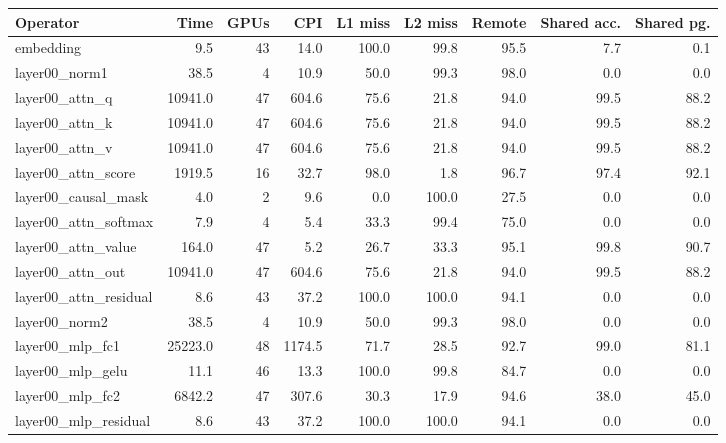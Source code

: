 \begin{tabular}{lrrrrrrrr}
\toprule
Operator & Time & GPUs & CPI & L1 miss & L2 miss & Remote & Shared acc. & Shared pg. \\
\midrule
embedding & 9.5 & 43 & 14.0 & 100.0 & 99.8 & 95.5 & 7.7 & 0.1 \\
layer00\_norm1 & 38.5 & 4 & 10.9 & 50.0 & 99.3 & 98.0 & 0.0 & 0.0 \\
layer00\_attn\_q & 10941.0 & 47 & 604.6 & 75.6 & 21.8 & 94.0 & 99.5 & 88.2 \\
layer00\_attn\_k & 10941.0 & 47 & 604.6 & 75.6 & 21.8 & 94.0 & 99.5 & 88.2 \\
layer00\_attn\_v & 10941.0 & 47 & 604.6 & 75.6 & 21.8 & 94.0 & 99.5 & 88.2 \\
layer00\_attn\_score & 1919.5 & 16 & 32.7 & 98.0 & 1.8 & 96.7 & 97.4 & 92.1 \\
layer00\_causal\_mask & 4.0 & 2 & 9.6 & 0.0 & 100.0 & 27.5 & 0.0 & 0.0 \\
layer00\_attn\_softmax & 7.9 & 4 & 5.4 & 33.3 & 99.4 & 75.0 & 0.0 & 0.0 \\
layer00\_attn\_value & 164.0 & 47 & 5.2 & 26.7 & 33.3 & 95.1 & 99.8 & 90.7 \\
layer00\_attn\_out & 10941.0 & 47 & 604.6 & 75.6 & 21.8 & 94.0 & 99.5 & 88.2 \\
layer00\_attn\_residual & 8.6 & 43 & 37.2 & 100.0 & 100.0 & 94.1 & 0.0 & 0.0 \\
layer00\_norm2 & 38.5 & 4 & 10.9 & 50.0 & 99.3 & 98.0 & 0.0 & 0.0 \\
layer00\_mlp\_fc1 & 25223.0 & 48 & 1174.5 & 71.7 & 28.5 & 92.7 & 99.0 & 81.1 \\
layer00\_mlp\_gelu & 11.1 & 46 & 13.3 & 100.0 & 99.8 & 84.7 & 0.0 & 0.0 \\
layer00\_mlp\_fc2 & 6842.2 & 47 & 307.6 & 30.3 & 17.9 & 94.6 & 38.0 & 45.0 \\
layer00\_mlp\_residual & 8.6 & 43 & 37.2 & 100.0 & 100.0 & 94.1 & 0.0 & 0.0 \\
\bottomrule
\end{tabular}
